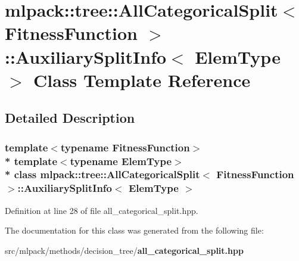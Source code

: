 \section{mlpack\+:\+:tree\+:\+:All\+Categorical\+Split$<$ Fitness\+Function $>$\+:\+:Auxiliary\+Split\+Info$<$ Elem\+Type $>$ Class Template Reference}
\label{classmlpack_1_1tree_1_1AllCategoricalSplit_1_1AuxiliarySplitInfo}


\subsection{Detailed Description}
\subsubsection*{template$<$typename Fitness\+Function$>$\\*
template$<$typename Elem\+Type$>$\\*
class mlpack\+::tree\+::\+All\+Categorical\+Split$<$ Fitness\+Function $>$\+::\+Auxiliary\+Split\+Info$<$ Elem\+Type $>$}



Definition at line 28 of file all\+\_\+categorical\+\_\+split.\+hpp.



The documentation for this class was generated from the following file\+:\begin{DoxyCompactItemize}
\item 
src/mlpack/methods/decision\+\_\+tree/{\bf all\+\_\+categorical\+\_\+split.\+hpp}\end{DoxyCompactItemize}
